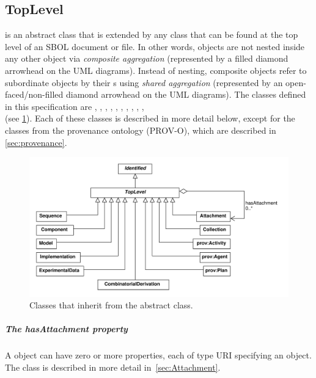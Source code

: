 \subsection {TopLevel}
\label{sec:TopLevel}
 is an abstract class that is extended by any  class that can be found at the top level of an SBOL document or file.
In other words,  objects are not nested inside any other object via \textit{composite aggregation} (represented by a filled diamond arrowhead on the UML diagrams).
Instead of nesting, composite  objects refer to subordinate  objects by their s using \textit{shared aggregation} (represented by an open-faced/non-filled diamond arrowhead on the UML diagrams).
The  classes defined in this specification are , , , , , , , , , , \\
 (see \ref{uml:toplevel}).  Each of these classes is described in more detail below, except for the classes from the provenance ontology (PROV-O), which are described in \ref{sec:provenance}.


\begin{figure}[ht]
\begin{center}
\includegraphics[width=\textwidth]{uml/toplevel}
\caption[]{Classes that inherit from the  abstract class.}
\label{uml:toplevel}
\end{center}
\end{figure}


\subparagraph{The hasAttachment property}
\label{sec:hasAttachment}
A  object can have zero or more  properties, each of type URI specifying an  object. The  class is described in more detail in~\ref{sec:Attachment}.

